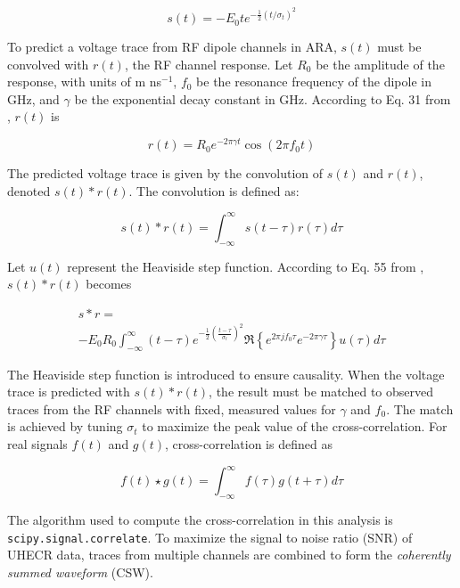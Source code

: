 \documentclass[amsmath,amssymb,aps,prd,10pt,twocolumn,showkeys]{revtex4}
\begin{document}
\begin{equation}
s(t) = -E_0 t e^{-\frac{1}{2}\left(t/\sigma_t\right)^2} \label{eq:s}
\end{equation}

To predict a voltage trace from RF dipole channels in ARA, $s(t)$ must be convolved with $r(t)$, the RF channel response.  Let $R_0$ be the amplitude of the response, with units of m ns$^{-1}$, $f_0$ be the resonance frequency of the dipole in GHz, and $\gamma$ be the exponential decay constant in GHz.  According to Eq. 31 from \cite{hansonnoyearcomplex-ae0}, $r(t)$ is

\begin{equation}
r(t) = R_0 e^{-2 \pi \gamma t} \cos(2\pi f_0 t) \label{eq:r}
\end{equation}

The predicted voltage trace is given by the convolution of $s(t)$ and $r(t)$, denoted $s(t) * r(t)$.  The convolution is defined as:

\begin{equation}
s(t) * r(t) = \int_{-\infty}^{\infty} s(t-\tau) r(\tau) d\tau 
\end{equation}

Let $u(t)$ represent the Heaviside step function.  According to Eq. 55 from \cite{hansonnoyearcomplex-ae0}, $s(t) * r(t)$ becomes

\begin{multline}
s * r = \\ -E_0 R_0 \int_{-\infty}^{\infty} (t-\tau) e^{-\frac{1}{2}\left(\frac{t-\tau}{\sigma_t}\right)^2} \Re\left\lbrace e^{2\pi j f_0 \tau} e^{-2\pi\gamma \tau} \right\rbrace u(\tau) d\tau \label{eq:sr}
\end{multline}

The Heaviside step function is introduced to ensure causality.  When the voltage trace is predicted with $s(t) * r(t)$, the result must be matched to observed traces from the RF channels with fixed, measured values for $\gamma$ and $f_0$.  The match is achieved by tuning $\sigma_t$ to maximize the peak value of the cross-correlation.  For real signals $f(t)$ and $g(t)$, cross-correlation is defined as

\begin{equation}
f(t) \star g(t) = \int_{-\infty}^{\infty} f(\tau) g(t+\tau) d\tau
\end{equation}

The algorithm used to compute the cross-correlation in this analysis is \verb+scipy.signal.correlate+.  To maximize the signal to noise ratio (SNR) of UHECR data, traces from multiple channels are combined to form the \textit{coherently summed waveform} (CSW). 
\end{document}

